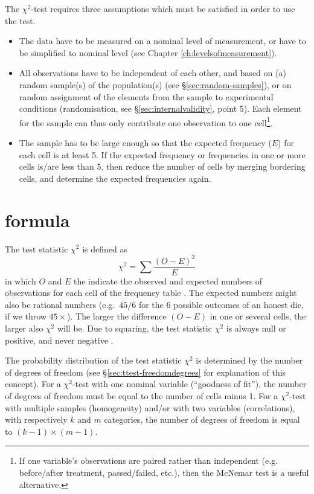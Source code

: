 \documentclass[
]{book}
\begin{document}
The \(\chi^2\)-test requires three assumptions which must be satisfied
in order to use the test.

\begin{itemize}
\item
  The data have to be measured on a nominal level of measurement, or have
  to be simplified to nominal level (see Chapter \ref{ch:levelsofmeasurement}).
\item
  All observations have to be independent of each other, and based
  on (a) random sample(s) of the population(s) (see
  §\ref{sec:random-samples}), or on random assignment of the elements
  from the sample to experimental conditions (randomisation, see
  §\ref{sec:internalvalidity}, point 5). Each element for the sample can thus only
  contribute one observation to one cell\footnote{If one variable's observations are paired rather than independent (e.g.
    before/after treatment, passed/failed, etc.), then the McNemar test is a useful
    alternative.}.
\item
  The sample has to be large enough so that the expected frequency
  (\(E\)) for each cell is at least 5. If the expected frequency or frequencies
  in one or more cells is/are less than 5, then reduce the number
  of cells by merging bordering cells, and determine the expected
  frequencies again.
\end{itemize}

\hypertarget{formula}{%
\section{formula}\label{formula}}

The test statistic \(\chi^2\) is defined as
\begin{equation}
  \label{eq:chisquared}
    \chi^2 = \sum \frac{(O-E)^2}{E}
\end{equation}
in which \(O\) and \(E\) the
indicate the observed and expected numbers of observations for each
cell of the frequency table \citep{Ferg89}. The expected
numbers might also be rational numbers (e.g.~\(45/6\) for the 6 possible
outcomes of an honest die, if we throw
\(45\times\)). The larger the difference \((O-E)\) in one or several cells,
the larger also \(\chi^2\) will be. Due to squaring, the test
statistic \(\chi^2\) is always null or positive, and never negative
\citep{Ferg89}.

The probability distribution of the test statistic \(\chi^2\) is determined by
the number of degrees of freedom (see
§\ref{sec:ttest-freedomdegrees} for explanation of this concept).
For a \(\chi^2\)-test with one nominal variable (``goodness of fit''), the number
of degrees of freedom must be equal to the number of cells minus 1. For a
\(\chi^2\)-test with multiple samples (homogeneity) and/or with two variables
(correlations), with respectively \(k\) and \(m\) categories, the number of
degrees of freedom is equal to \((k-1)\times(m-1)\).
\end{document}
